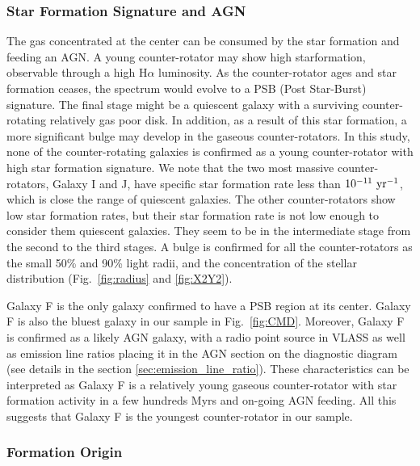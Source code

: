 \documentclass[fleqn,usenatbib]{mnras}
\begin{document}
\subsubsection{Star Formation Signature and AGN} \label{sec:discussion_SF}

The gas concentrated at the center 
can be consumed by the star formation and feeding an AGN.
A young counter-rotator may show high starformation,
observable through a high H$\alpha$ luminosity.
As the counter-rotator ages and star formation ceases, the spectrum would evolve to a PSB (Post Star-Burst) signature.
The final stage might be a quiescent galaxy with a surviving counter-rotating relatively gas poor disk.
In addition, as a result of this star formation, 
a more significant bulge may develop in the gaseous counter-rotators.
In this study, none of the counter-rotating galaxies is confirmed 
as a young counter-rotator with high star formation signature.
We note that the two most massive counter-rotators, 
Galaxy I and J, have specific star formation rate less than
$\rm 10^{-11}~yr^{-1}$, which is close the range of quiescent galaxies. 
The other counter-rotators show low star formation rates, 
but their star formation rate is not low enough 
to consider them quiescent galaxies. 
They seem to be in the intermediate stage 
from the second to the third stages. 
A bulge is  confirmed for all the counter-rotators
as the small 50\% and 90\% light radii, and 
the concentration of the stellar distribution 
(Fig.~\ref{fig:radius} and \ref{fig:X2Y2}).

Galaxy F is the only galaxy confirmed to have a PSB region at its center. 
Galaxy F is also the bluest galaxy in our sample in Fig.~\ref{fig:CMD}.
Moreover, Galaxy F is confirmed as a likely AGN galaxy,
with a radio point source in VLASS
as well as emission line ratios placing it in the AGN section on the diagnostic diagram 
(see details in the section \ref{sec:emission_line_ratio}).
These characteristics can be interpreted as Galaxy F is 
a relatively young gaseous counter-rotator with star formation activity in a few hundreds Myrs and on-going AGN feeding. All this suggests that Galaxy F is the youngest counter-rotator in our sample.



\subsubsection{Formation Origin} \label{sec:origin}
\end{document}
